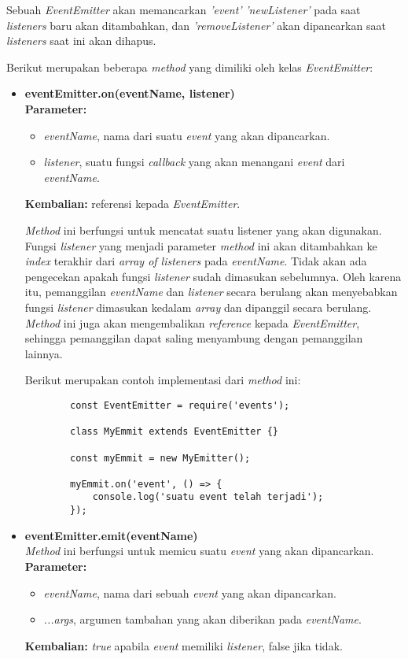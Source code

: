 Sebuah \textit{EventEmitter} akan memancarkan \textit{'event'} \textit{'newListener'} pada saat \textit{listeners} baru akan ditambahkan, dan \textit{'removeListener'} akan dipancarkan saat \textit{listeners} saat ini akan dihapus.

Berikut merupakan beberapa \textit{method} yang dimiliki oleh kelas \textit{EventEmitter}:

\begin{itemize}
	\item \textbf{eventEmitter.on(eventName, listener)} \\ \textbf{Parameter:}
	\begin{itemize}
		\item \textit{eventName}, nama dari suatu \textit{event} yang akan dipancarkan.
		\item \textit{listener}, suatu fungsi \textit{callback} yang akan menangani \textit{event} dari \textit{eventName}. 
	\end{itemize} 
	\textbf{Kembalian:} referensi kepada \textit{EventEmitter}.

	\textit{Method} ini berfungsi untuk mencatat suatu listener yang akan digunakan. Fungsi \textit{listener} yang menjadi parameter \textit{method} ini akan ditambahkan ke \textit{index} terakhir dari \textit{array of listeners} pada \textit{eventName}. Tidak akan ada pengecekan apakah fungsi \textit{listener} sudah dimasukan sebelumnya. Oleh karena itu, pemanggilan \textit{eventName} dan \textit{listener} secara berulang akan menyebabkan fungsi \textit{listener} dimasukan kedalam \textit{array} dan dipanggil secara berulang. \textit{Method} ini juga akan mengembalikan \textit{reference} kepada \textit{EventEmitter}, sehingga pemanggilan dapat saling menyambung dengan pemanggilan lainnya.
	
	Berikut merupakan contoh implementasi dari \textit{method} ini:
	\begin{lstlisting}
		const EventEmitter = require('events');
		
		class MyEmmit extends EventEmitter {}
		
		const myEmmit = new MyEmitter();
		
		myEmmit.on('event', () => {
			console.log('suatu event telah terjadi');	
		});
	\end{lstlisting}
	
	\item \textbf{eventEmitter.emit(eventName)} \\ \textit{Method} ini berfungsi untuk memicu suatu \textit{event} yang akan dipancarkan. \textbf{Parameter:}
	\begin{itemize}
		\item \textit{eventName}, nama dari sebuah \textit{event} yang akan dipancarkan.
		\item \textit{...args}, argumen tambahan yang akan diberikan pada \textit{eventName}. 
	\end{itemize}
	\textbf{Kembalian:} \textit{true} apabila \textit{event} memiliki \textit{listener}, false jika tidak.


\end{itemize}

